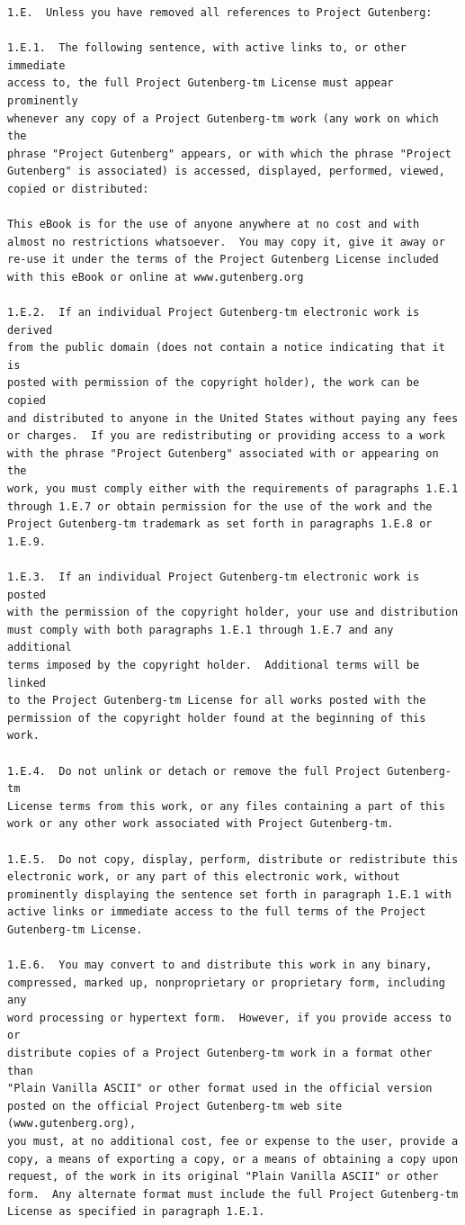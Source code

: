 \documentclass{book}
\begin{document}
\begin{verbatim}
1.E.  Unless you have removed all references to Project Gutenberg:

1.E.1.  The following sentence, with active links to, or other immediate
access to, the full Project Gutenberg-tm License must appear prominently
whenever any copy of a Project Gutenberg-tm work (any work on which the
phrase "Project Gutenberg" appears, or with which the phrase "Project
Gutenberg" is associated) is accessed, displayed, performed, viewed,
copied or distributed:

This eBook is for the use of anyone anywhere at no cost and with
almost no restrictions whatsoever.  You may copy it, give it away or
re-use it under the terms of the Project Gutenberg License included
with this eBook or online at www.gutenberg.org

1.E.2.  If an individual Project Gutenberg-tm electronic work is derived
from the public domain (does not contain a notice indicating that it is
posted with permission of the copyright holder), the work can be copied
and distributed to anyone in the United States without paying any fees
or charges.  If you are redistributing or providing access to a work
with the phrase "Project Gutenberg" associated with or appearing on the
work, you must comply either with the requirements of paragraphs 1.E.1
through 1.E.7 or obtain permission for the use of the work and the
Project Gutenberg-tm trademark as set forth in paragraphs 1.E.8 or
1.E.9.

1.E.3.  If an individual Project Gutenberg-tm electronic work is posted
with the permission of the copyright holder, your use and distribution
must comply with both paragraphs 1.E.1 through 1.E.7 and any additional
terms imposed by the copyright holder.  Additional terms will be linked
to the Project Gutenberg-tm License for all works posted with the
permission of the copyright holder found at the beginning of this work.

1.E.4.  Do not unlink or detach or remove the full Project Gutenberg-tm
License terms from this work, or any files containing a part of this
work or any other work associated with Project Gutenberg-tm.

1.E.5.  Do not copy, display, perform, distribute or redistribute this
electronic work, or any part of this electronic work, without
prominently displaying the sentence set forth in paragraph 1.E.1 with
active links or immediate access to the full terms of the Project
Gutenberg-tm License.

1.E.6.  You may convert to and distribute this work in any binary,
compressed, marked up, nonproprietary or proprietary form, including any
word processing or hypertext form.  However, if you provide access to or
distribute copies of a Project Gutenberg-tm work in a format other than
"Plain Vanilla ASCII" or other format used in the official version
posted on the official Project Gutenberg-tm web site (www.gutenberg.org),
you must, at no additional cost, fee or expense to the user, provide a
copy, a means of exporting a copy, or a means of obtaining a copy upon
request, of the work in its original "Plain Vanilla ASCII" or other
form.  Any alternate format must include the full Project Gutenberg-tm
License as specified in paragraph 1.E.1.


\end{verbatim}
\end{document}

